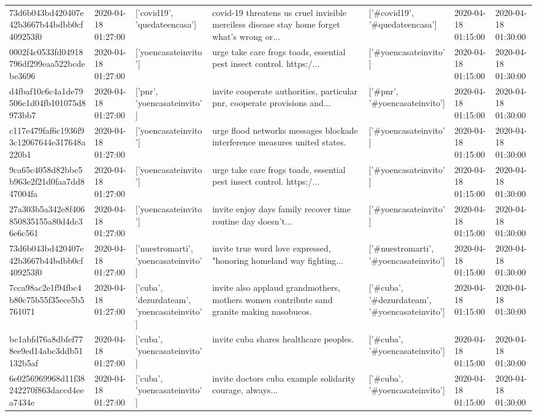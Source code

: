 \begin{tabular}{lllllll}
73d6b043bd420407e42b3667b44bdbb0cf409253f0 & 2020-04-18 01:27:00 & ['covid19', 'quedateencasa'] & covid-19 threatens us cruel invisible merciless disease stay home forget what's wrong or... & ['#covid19', '#quedateencasa'] & 2020-04-18 01:15:00 & 2020-04-18 01:30:00 \\
0002f4c0533fd04918796df299eaa522bcdebe3696 & 2020-04-18 01:27:00 & ['yoencasateinvito'] & urge take care frogs toads, essential pest insect control. https:/... & ['#yoencasateinvito'] & 2020-04-18 01:15:00 & 2020-04-18 01:30:00 \\
d4fbaf10c6c4a1de79506c1d04fb101075d8973bb7 & 2020-04-18 01:27:00 & ['pnr', 'yoencasateinvito'] & invite cooperate authorities, particular pnr, cooperate provisions and... & ['#pnr', '#yoencasateinvito'] & 2020-04-18 01:15:00 & 2020-04-18 01:30:00 \\
c117e479faf6c1936f93c12067644e317648a220b1 & 2020-04-18 01:27:00 & ['yoencasateinvito'] & urge flood networks messages blockade interference measures united states. & ['#yoencasateinvito'] & 2020-04-18 01:15:00 & 2020-04-18 01:30:00 \\
9ca65c4058d82bbc5b963e2f21d0faa7dd847004fa & 2020-04-18 01:27:00 & ['yoencasateinvito'] & urge take care frogs toads, essential pest insect control. https:/... & ['#yoencasateinvito'] & 2020-04-18 01:15:00 & 2020-04-18 01:30:00 \\
27a303b5a342e8f406850835155a80d4dc36e6c561 & 2020-04-18 01:27:00 & ['yoencasateinvito'] & invite enjoy days family recover time routine day doesn't... & ['#yoencasateinvito'] & 2020-04-18 01:15:00 & 2020-04-18 01:30:00 \\
73d6b043bd420407e42b3667b44bdbb0cf409253f0 & 2020-04-18 01:27:00 & ['nuestromarti', 'yoencasateinvito'] & invite true word love expressed, "honoring homeland way fighting... & ['#nuestromarti', '#yoencasateinvito'] & 2020-04-18 01:15:00 & 2020-04-18 01:30:00 \\
7cca98ac2e1f94fbc4b80c75b55f35ece5b5761071 & 2020-04-18 01:27:00 & ['cuba', 'dezurdateam', 'yoencasateinvito'] & invite also applaud grandmothers, mothers women contribute sand granite making nasobucos. & ['#cuba', '#dezurdateam', '#yoencasateinvito'] & 2020-04-18 01:15:00 & 2020-04-18 01:30:00 \\
bc1abfd76a8dbfef778ee9ed14abc3ddb51132b5af & 2020-04-18 01:27:00 & ['cuba', 'yoencasateinvito'] & invite cuba shares healthcare peoples. & ['#cuba', '#yoencasateinvito'] & 2020-04-18 01:15:00 & 2020-04-18 01:30:00 \\
6e0256969968d11f38242270f863daccd4eea7434e & 2020-04-18 01:27:00 & ['cuba', 'yoencasateinvito'] & invite doctors cuba example solidarity courage, always... & ['#cuba', '#yoencasateinvito'] & 2020-04-18 01:15:00 & 2020-04-18 01:30:00 \\

\end{tabular}
